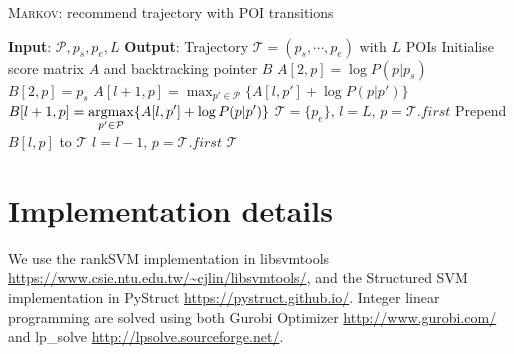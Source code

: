 \begin{algorithm}[t]
\caption{\textsc{Markov}: recommend trajectory with POI transitions}
\label{alg:markov}
\begin{algorithmic}[1]
\STATE \textbf{Input}: $\mathcal{P}, p_s, p_e, L$
\STATE \textbf{Output}: Trajectory $\mathcal{T} = (p_s, \cdots, p_e)$ with $L$ POIs
\STATE Initialise score matrix $A$ and backtracking pointer $B$
    \STATE $A[2, p] = \log P(p|p_s)$
    \STATE $B[2, p] = p_s$
\ENDFOR
{}
        \STATE \(\displaystyle A[l+1, p] = \max_{p' \in \mathcal{P}} \{ A[l, p'] + \log P(p|p') \} \)
        \STATE \(\displaystyle B[l+1, p] = \operatorname*{argmax}_{p' \in \mathcal{P}} \{ A[l, p'] + \log P(p|p') \} \)
    \ENDFOR
\ENDFOR
\STATE $\mathcal{T} = \{p_e\}$, $l = L$, $p = \mathcal{T}.first$
\REPEAT
    \STATE Prepend $B[l, p]$ to $\mathcal{T}$
    \STATE $l = l - 1$, $p = \mathcal{T}.first$
\RETURN $\mathcal{T}$
\end{algorithmic}
\end{algorithm}




\section{Implementation details}
We use the rankSVM implementation in libsvmtools \url{https://www.csie.ntu.edu.tw/~cjlin/libsvmtools/},
and the Structured SVM implementation in PyStruct \url{https://pystruct.github.io/}.
Integer linear programming are solved using both Gurobi Optimizer \url{http://www.gurobi.com/} 
and lp\_solve \url{http://lpsolve.sourceforge.net/}.


